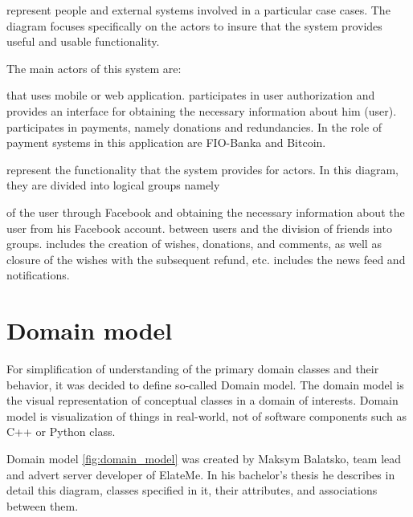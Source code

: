 \begin{itemize}
 represent people and external systems involved in a particular case cases. The diagram focuses specifically on the actors to insure that the system provides useful and usable functionality.

The main actors of this system are:
\begin{itemize}
 that uses mobile or web application.
 participates in user authorization and provides an interface for obtaining the necessary information about him (user).
 participates in payments, namely donations and redundancies. In the role of payment systems in this application are FIO-Banka and Bitcoin.
\end{itemize}

 represent the functionality that the system provides for actors. In this diagram, they are divided into logical groups namely
\begin{itemize}
 of the user through Facebook and obtaining the necessary information about the user from his Facebook account.
 between users and the division of friends into groups.
 includes the creation of wishes, donations, and comments, as well as closure of the wishes with the subsequent refund, etc.
 includes the news feed and notifications.
\end{itemize}

\end{itemize}


\section{Domain model}
For simplification of understanding of the primary domain classes and their behavior, it was decided to define so-called Domain model. The domain model is the visual representation of conceptual classes in a domain of interests. Domain model is visualization of things in real-world, not of software components such as C++ or Python class.\cite{domainmodel}

Domain model \ref{fig:domain_model} was created by Maksym Balatsko, team lead and advert server developer of ElateMe. In his bachelor's thesis\cite{adserver} he describes in detail this diagram, classes specified in it, their attributes, and associations between them.

